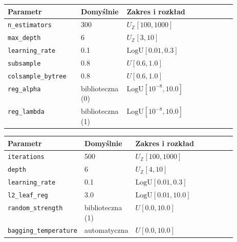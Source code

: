 \par\medskip\noindent\begin{minipage}{\linewidth}\captionsetup{hypcap=false}\centering\footnotesize
{}
\begin{tabularx}{\linewidth}{@{}P{0.32\linewidth}P{0.20\linewidth}Y@{}}
\toprule Parametr & Domyślnie & Zakres i rozkład \\
\midrule
\texttt{n\_estimators} & 300 & $U_{\mathbb Z}[100, 1000]$ \\
\texttt{max\_depth} & 6 & $U_{\mathbb Z}[3, 10]$ \\
\texttt{learning\_rate} & 0.1 & $\mathrm{LogU}[0.01, 0.3]$ \\
\texttt{subsample} & 0.8 & $U[0.6, 1.0]$ \\
\texttt{colsample\_bytree} & 0.8 & $U[0.6, 1.0]$ \\
\texttt{reg\_alpha} & biblioteczna (0) & $\mathrm{LogU}[10^{-8}, 10.0]$ \\
\texttt{reg\_lambda} & biblioteczna (1) & $\mathrm{LogU}[10^{-8}, 10.0]$ \\
\bottomrule\end{tabularx}\end{minipage}\par\medskip

\par\medskip\noindent\begin{minipage}{\linewidth}\captionsetup{hypcap=false}\centering\footnotesize
{}
\begin{tabularx}{\linewidth}{@{}P{0.32\linewidth}P{0.20\linewidth}Y@{}}
\toprule Parametr & Domyślnie & Zakres i rozkład \\
\midrule
\texttt{iterations} & 500 & $U_{\mathbb Z}[100, 1000]$ \\
\texttt{depth} & 6 & $U_{\mathbb Z}[4, 10]$ \\
\texttt{learning\_rate} & 0.1 & $\mathrm{LogU}[0.01, 0.3]$ \\
\texttt{l2\_leaf\_reg} & 3.0 & $\mathrm{LogU}[0.01, 10.0]$ \\
\texttt{random\_strength} & biblioteczna (1) & $U[0.0, 10.0]$ \\
\texttt{bagging\_temperature} & automatyczna & $U[0.0, 10.0]$ \\
\bottomrule\end{tabularx}\end{minipage}\par\medskip

